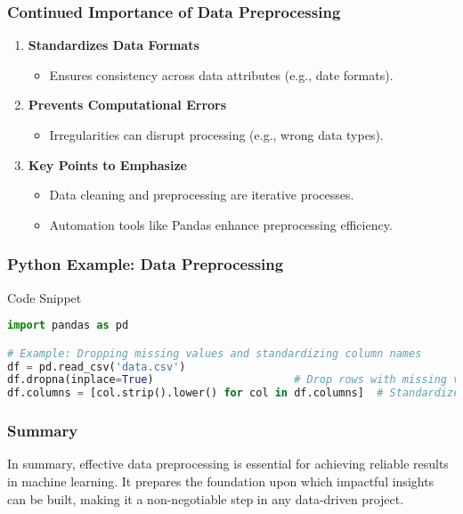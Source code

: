 \documentclass[aspectratio=169]{beamer}
\begin{document}
\begin{frame}[fragile]
    \frametitle{Continued Importance of Data Preprocessing}
    \begin{enumerate}[resume]
        \item \textbf{Standardizes Data Formats}
        \begin{itemize}
            \item Ensures consistency across data attributes (e.g., date formats).
        \end{itemize}

        \item \textbf{Prevents Computational Errors}
        \begin{itemize}
            \item Irregularities can disrupt processing (e.g., wrong data types).
        \end{itemize}

        \item \textbf{Key Points to Emphasize}
        \begin{itemize}
            \item Data cleaning and preprocessing are iterative processes.
            \item Automation tools like Pandas enhance preprocessing efficiency.
        \end{itemize}
    \end{enumerate}
\end{frame}

\begin{frame}[fragile]
    \frametitle{Python Example: Data Preprocessing}
    \begin{block}{Code Snippet}
    \begin{lstlisting}[language=Python]
import pandas as pd

# Example: Dropping missing values and standardizing column names
df = pd.read_csv('data.csv')
df.dropna(inplace=True)                      # Drop rows with missing values
df.columns = [col.strip().lower() for col in df.columns]  # Standardize column names
    \end{lstlisting}
    \end{block}
\end{frame}

\begin{frame}[fragile]
    \frametitle{Summary}
    In summary, effective data preprocessing is essential for achieving reliable results in machine learning. 
    It prepares the foundation upon which impactful insights can be built, making it a non-negotiable step in any data-driven project.
\end{frame}
\end{document}
